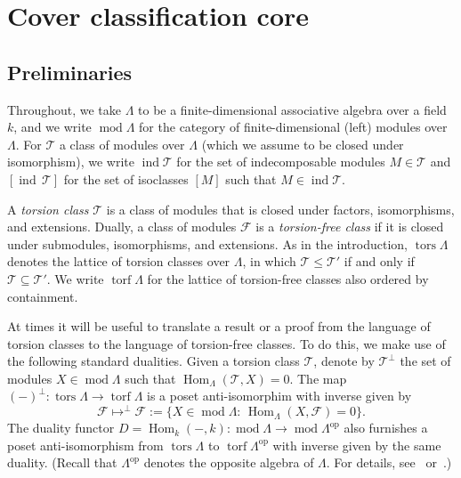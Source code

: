 \documentclass[10pt]{amsart}
\providecommand{\1}{}
\DeclareMathOperator{\tors}{tors}
\DeclareMathOperator{\torf}{torf}
\DeclareMathOperator{\op}{op}
\DeclareMathOperator{\Hom}{Hom}
\DeclareMathOperator{\ind}{ind}
\DeclareMathOperator{\module}{mod}
\newcommand{\calF}{\mathcal{F}}
\newcommand{\calT}{\mathcal{T}}
\renewcommand{\1}{\hat{1}}
\newcommand{\0}{\hat{0}}
\newcommand{\newword}[1]{\emph{#1}}
\theoremstyle{definition}
\begin{document}
\section{Cover classification core}
\subsection{Preliminaries}\label{sec: background torsion classes}
Throughout, we take $\Lambda$ to be a finite-dimensional associative
algebra over a field $k$, and we write $\module\Lambda$ for the category of finite-dimensional (left) modules over $\Lambda$.
For $\calT$ a class of modules over $\Lambda$ (which we assume to be closed
under isomorphism), we write $\ind \calT$ for the set of indecomposable modules $M\in \calT$ and $[\ind\, \calT]$ for the set of isoclasses $[M]$ such that $M\in \ind \calT$.

A \newword{torsion class} $\calT$ is a class of modules that is closed under factors, isomorphisms, and extensions.
Dually, a class of modules $\calF$ is a \newword{torsion-free class} if it is closed under submodules, isomorphisms, and extensions.
As in the introduction, $\tors \Lambda$ denotes the lattice of torsion classes over $\Lambda$, in which $\calT\le \calT'$ if and only if~$\calT\subseteq \calT'$.
We write $\torf \Lambda$ for the lattice of torsion-free classes also ordered by containment.

At times it will be useful to translate a result or a proof from the language of torsion classes to the language of torsion-free classes.
To do this, we make use of the following standard dualities.
Given a torsion class $\calT$, denote by $\calT^\perp$ the set of modules $X\in
\module \Lambda$ such that $\Hom_\Lambda(\calT, X) = 0$.
The map $(-)^\perp: \tors \Lambda \rightarrow \torf \Lambda$ is a poset
anti-isomorphim with inverse given by $$\calF \mapsto ^\perp
\calF:=\{X\in \module \Lambda:\, \Hom_\Lambda(X, \calF)=0\}.$$
The duality functor $D=\Hom_k(-,k): \module \Lambda \rightarrow \module \Lambda^{\op}$ also furnishes a poset anti-isomorphism from $\tors
\Lambda$ to $\torf \Lambda^{\op}$ with inverse given by the same duality.
(Recall that $\Lambda^{\op}$ denotes the opposite algebra of
$\Lambda$. For details, see~\cite{IRTT} or~\cite{S}.)
\end{document}
